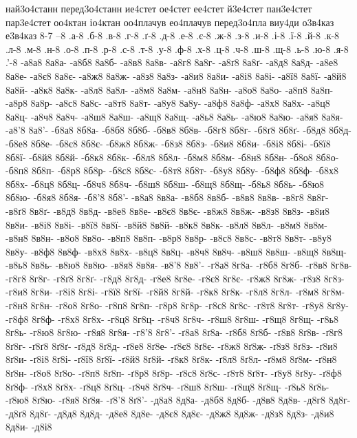 {най3о4станн
перед3о4станн
ие4стет
ое4стет
ее4стет
й3е4стет
пан3е4стет
пар3е4стет
оо4ктан
іо4ктан
оо4плачув
ео4плачув
перед3о4пла
виу4ди
о3в4каз
е3в4каз
8-7
--8
.а-8
.б-8
.в-8
.г-8
.ґ-8
.д-8
.е-8
.є-8
.ж-8
.з-8
.и-8
.і-8
.ї-8
.й-8
.к-8
.л-8
.м-8
.н-8
.о-8
.п-8
.р-8
.с-8
.т-8
.у-8
.ф-8
.х-8
.ц-8
.ч-8
.ш-8
.щ-8
.ь-8
.ю-8
.я-8
.'-8
-а8а8
8а8а-
-а8б8
8а8б-
-а8в8
8а8в-
-а8г8
8а8г-
-а8ґ8
8а8ґ-
-а8д8
8а8д-
-а8е8
8а8е-
-а8є8
8а8є-
-а8ж8
8а8ж-
-а8з8
8а8з-
-а8и8
8а8и-
-а8і8
8а8і-
-а8ї8
8а8ї-
-а8й8
8а8й-
-а8к8
8а8к-
-а8л8
8а8л-
-а8м8
8а8м-
-а8н8
8а8н-
-а8о8
8а8о-
-а8п8
8а8п-
-а8р8
8а8р-
-а8с8
8а8с-
-а8т8
8а8т-
-а8у8
8а8у-
-а8ф8
8а8ф-
-а8х8
8а8х-
-а8ц8
8а8ц-
-а8ч8
8а8ч-
-а8ш8
8а8ш-
-а8щ8
8а8щ-
-а8ь8
8а8ь-
-а8ю8
8а8ю-
-а8я8
8а8я-
-а8'8
8а8'-
-б8а8
8б8а-
-б8б8
8б8б-
-б8в8
8б8в-
-б8г8
8б8г-
-б8ґ8
8б8ґ-
-б8д8
8б8д-
-б8е8
8б8е-
-б8є8
8б8є-
-б8ж8
8б8ж-
-б8з8
8б8з-
-б8и8
8б8и-
-б8і8
8б8і-
-б8ї8
8б8ї-
-б8й8
8б8й-
-б8к8
8б8к-
-б8л8
8б8л-
-б8м8
8б8м-
-б8н8
8б8н-
-б8о8
8б8о-
-б8п8
8б8п-
-б8р8
8б8р-
-б8с8
8б8с-
-б8т8
8б8т-
-б8у8
8б8у-
-б8ф8
8б8ф-
-б8х8
8б8х-
-б8ц8
8б8ц-
-б8ч8
8б8ч-
-б8ш8
8б8ш-
-б8щ8
8б8щ-
-б8ь8
8б8ь-
-б8ю8
8б8ю-
-б8я8
8б8я-
-б8'8
8б8'-
-в8а8
8в8а-
-в8б8
8в8б-
-в8в8
8в8в-
-в8г8
8в8г-
-в8ґ8
8в8ґ-
-в8д8
8в8д-
-в8е8
8в8е-
-в8є8
8в8є-
-в8ж8
8в8ж-
-в8з8
8в8з-
-в8и8
8в8и-
-в8і8
8в8і-
-в8ї8
8в8ї-
-в8й8
8в8й-
-в8к8
8в8к-
-в8л8
8в8л-
-в8м8
8в8м-
-в8н8
8в8н-
-в8о8
8в8о-
-в8п8
8в8п-
-в8р8
8в8р-
-в8с8
8в8с-
-в8т8
8в8т-
-в8у8
8в8у-
-в8ф8
8в8ф-
-в8х8
8в8х-
-в8ц8
8в8ц-
-в8ч8
8в8ч-
-в8ш8
8в8ш-
-в8щ8
8в8щ-
-в8ь8
8в8ь-
-в8ю8
8в8ю-
-в8я8
8в8я-
-в8'8
8в8'-
-г8а8
8г8а-
-г8б8
8г8б-
-г8в8
8г8в-
-г8г8
8г8г-
-г8ґ8
8г8ґ-
-г8д8
8г8д-
-г8е8
8г8е-
-г8є8
8г8є-
-г8ж8
8г8ж-
-г8з8
8г8з-
-г8и8
8г8и-
-г8і8
8г8і-
-г8ї8
8г8ї-
-г8й8
8г8й-
-г8к8
8г8к-
-г8л8
8г8л-
-г8м8
8г8м-
-г8н8
8г8н-
-г8о8
8г8о-
-г8п8
8г8п-
-г8р8
8г8р-
-г8с8
8г8с-
-г8т8
8г8т-
-г8у8
8г8у-
-г8ф8
8г8ф-
-г8х8
8г8х-
-г8ц8
8г8ц-
-г8ч8
8г8ч-
-г8ш8
8г8ш-
-г8щ8
8г8щ-
-г8ь8
8г8ь-
-г8ю8
8г8ю-
-г8я8
8г8я-
-г8'8
8г8'-
-ґ8а8
8ґ8а-
-ґ8б8
8ґ8б-
-ґ8в8
8ґ8в-
-ґ8г8
8ґ8г-
-ґ8ґ8
8ґ8ґ-
-ґ8д8
8ґ8д-
-ґ8е8
8ґ8е-
-ґ8є8
8ґ8є-
-ґ8ж8
8ґ8ж-
-ґ8з8
8ґ8з-
-ґ8и8
8ґ8и-
-ґ8і8
8ґ8і-
-ґ8ї8
8ґ8ї-
-ґ8й8
8ґ8й-
-ґ8к8
8ґ8к-
-ґ8л8
8ґ8л-
-ґ8м8
8ґ8м-
-ґ8н8
8ґ8н-
-ґ8о8
8ґ8о-
-ґ8п8
8ґ8п-
-ґ8р8
8ґ8р-
-ґ8с8
8ґ8с-
-ґ8т8
8ґ8т-
-ґ8у8
8ґ8у-
-ґ8ф8
8ґ8ф-
-ґ8х8
8ґ8х-
-ґ8ц8
8ґ8ц-
-ґ8ч8
8ґ8ч-
-ґ8ш8
8ґ8ш-
-ґ8щ8
8ґ8щ-
-ґ8ь8
8ґ8ь-
-ґ8ю8
8ґ8ю-
-ґ8я8
8ґ8я-
-ґ8'8
8ґ8'-
-д8а8
8д8а-
-д8б8
8д8б-
-д8в8
8д8в-
-д8г8
8д8г-
-д8ґ8
8д8ґ-
-д8д8
8д8д-
-д8е8
8д8е-
-д8є8
8д8є-
-д8ж8
8д8ж-
-д8з8
8д8з-
-д8и8
8д8и-
-д8і8
}
